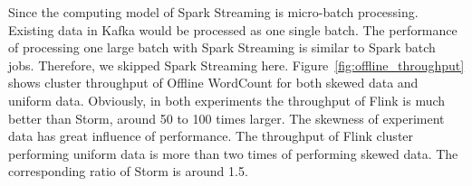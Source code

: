 Since the computing model of Spark Streaming is micro-batch processing. Existing data in Kafka would be processed as one single batch. The performance of processing one large batch with Spark Streaming is similar to Spark batch jobs. Therefore, we skipped Spark Streaming here. Figure~\ref{fig:offline_throughput} shows cluster throughput of Offline WordCount for both skewed data and uniform data. Obviously, in both experiments the throughput of Flink is much better than Storm, around 50 to 100 times larger. The skewness of experiment data has great influence of performance. The throughput of Flink cluster performing uniform data is more than two times of performing skewed data. The corresponding ratio of Storm is around 1.5. 

\begin{figure}[t!]
  \begin{center}

\end{center}
\end{figure}
